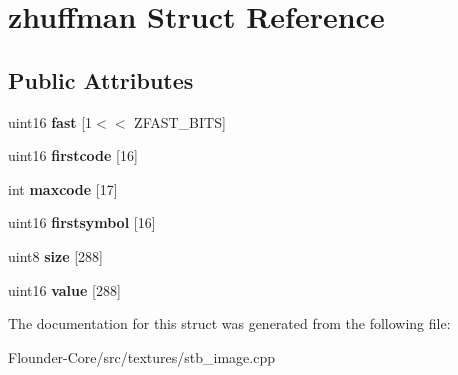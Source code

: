 \hypertarget{structzhuffman}{}\section{zhuffman Struct Reference}
\label{structzhuffman}
\subsection*{Public Attributes}
\begin{DoxyCompactItemize}
\item 
\mbox{\label{structzhuffman_a12d5f92a121b65680e5f0b4027d00c96}} 
uint16 {\bfseries fast} \mbox{[}1$<$$<$ Z\+F\+A\+S\+T\+\_\+\+B\+I\+TS\mbox{]}
\item 
\mbox{\label{structzhuffman_a81f5ae5bd31b40439955de6154572917}} 
uint16 {\bfseries firstcode} \mbox{[}16\mbox{]}
\item 
\mbox{\label{structzhuffman_ac7dd4a2bf01a6e27933dd1cf6b0cc762}} 
int {\bfseries maxcode} \mbox{[}17\mbox{]}
\item 
\mbox{\label{structzhuffman_afbdb21fd99f413fc8f9e58243552fe95}} 
uint16 {\bfseries firstsymbol} \mbox{[}16\mbox{]}
\item 
\mbox{\label{structzhuffman_a46ce4d4a4d7fc41c2560616f6696e9b9}} 
uint8 {\bfseries size} \mbox{[}288\mbox{]}
\item 
\mbox{\label{structzhuffman_acc395b638b700b944c329d71a8b82084}} 
uint16 {\bfseries value} \mbox{[}288\mbox{]}
\end{DoxyCompactItemize}


The documentation for this struct was generated from the following file\+:\begin{DoxyCompactItemize}
\item 
Flounder-\/\+Core/src/textures/stb\+\_\+image.\+cpp\end{DoxyCompactItemize}
